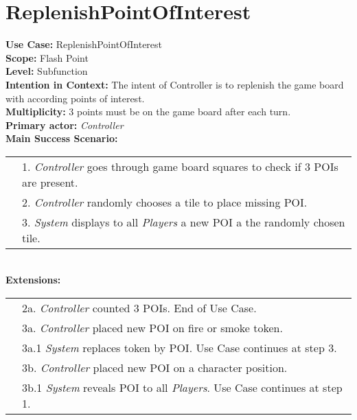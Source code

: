 \documentclass{article}
\begin{document}
	\section*{ReplenishPointOfInterest}
	\textbf{Use Case:} ReplenishPointOfInterest\\
	\textbf{Scope:} Flash Point\\
	\textbf{Level:} Subfunction\\
	\textbf{Intention in Context:} The intent of Controller is to replenish the game board with according points of interest.\\
	\textbf{Multiplicity:} 3 points must be on the game board after each turn.\\
	\textbf{Primary actor:} \textit{Controller}\\
	\textbf{Main Success Scenario:}\\
	\begin{tabular}{l l}
		&1. \textit{Controller} goes through game board squares to check if 3 POIs are present.\\
		&2. \textit{Controller} randomly chooses a tile to place missing POI.\\
		&3. \textit{System} displays to all \textit{Players} a new POI a the randomly chosen tile.
	\end{tabular}\\
	\textbf{Extensions:}\\
	\begin{tabular}{l l}
		&2a. \textit{Controller} counted 3 POIs. End of Use Case.\\
		&3a. \textit{Controller} placed new POI on fire or smoke token.\\
		&\qquad3a.1 \textit{System} replaces token by POI. Use Case continues at step 3.\\
		&3b. \textit{Controller} placed new POI on a character position.\\
		&\qquad3b.1 \textit{System} reveals POI to all \textit{Players}. Use Case continues at step 1.
	\end{tabular}
\end{document}
